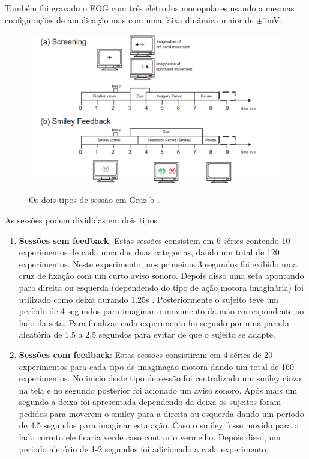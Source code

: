  Tamb\'em foi gravado o \ac{EOG} com tr\^es eletrodos monopolares usando a mesmas configura\c{c}\~oes de amplica\c{c}\~ao mas com uma faixa din\^amica maior de $\pm 1$mV.
 \par
  \begin{figure}[h!]
 	\caption{Os dois tipos de sess\~ao em Graz-b \cite{GrazBData}. }  	
  	\centering
 	\includegraphics[scale=0.5]{./figuras/graz_b_session}
 	\label{fig:Graz-Session}
 \end{figure}
 As sess\~oes podem divididas em dois tipos
\begin{enumerate}[label=(\alph*)]
	\item \textbf{Sess\~oes sem feedback}: 
	Estas sess\~oes consistem em 6 s\'eries contendo 10 experimentos de cada uma das duas categorias, dando um total de 120 experimentos.
	Neste experimento, nos primeiros 3 segundos foi exibido uma cruz de fixa\c{c}\~ao com um curto aviso sonoro.
	Depois disso uma seta apontando para direita ou esquerda (dependendo do tipo de a\c{c}\~ao motora imagin\'aria) foi utilizado como deixa durando 1.25s .
	 Posteriormente o sujeito teve um período de 4 segundos para imaginar o movimento da m\~ao correspondente ao lado da seta.
	 Para finalizar cada experimento foi seguido por uma parada aleat\'oria de 1.5 a 2.5 segundos para evitar de que o sujeito se adapte.
	\item \textbf{Sess\~oes com feedback}:
	Estas sess\~oes consistiram em 4 s\'eries de 20 experimentos para cada tipo de imagina\c{c}\~ao motora dando um total de 160 experimentos. 
	No inicio deste tipo de sess\~ao foi centralizado um smiley cinza na tela e no segundo posterior foi acionado um aviso sonoro. Ap\'os mais um segundo a deixa foi apresentada dependendo da deixa os sujeitos foram pedidos para moverem o smiley para a direita ou esquerda dando um per\'iodo de 4.5 segundos para imaginar esta a\c{c}\~ao. Caso o smiley fosse movido para o lado correto ele ficaria verde caso contrario vermelho.
	Depois disso, um periodo alet\'orio de 1-2 segundos foi adicionado a cada experimento.
\end{enumerate}
\clearpage
